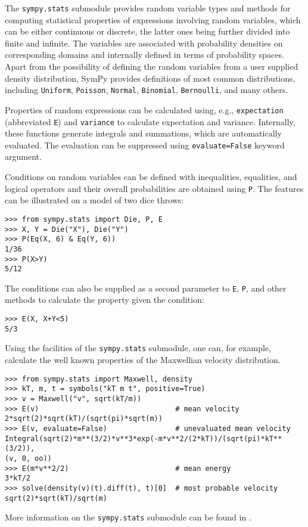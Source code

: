 The \verb|sympy.stats| submodule provides random variable types and methods for
computing statistical properties of expressions involving random
variables, which can be either continuous or discrete, the latter ones being
further divided into finite and infinite. The variables are associated
with probability densities on corresponding domains and internally defined
in terms of probability spaces.
Apart from the possibility of defining the random variables from a user supplied
density distribution, SymPy provides definitions of most common
distributions, including \texttt{Uniform}, \texttt{Poisson}, \texttt{Normal},
\texttt{Binomial}, \texttt{Bernoulli}, and many others.

Properties of random expressions can be calculated using, e.g.,
\texttt{expectation} (abbreviated \texttt{E}) and \texttt{variance} to
calculate expectation and variance. Internally, these functions generate
integrals and summations, which are automatically evaluated. The evaluation
can be suppressed using \texttt{evaluate=False} keyword argument.

Conditions on random variables can be defined with inequalities, equalities,
and logical operators and their overall probabilities are obtained using
\texttt{P}. The features can be illustrated on a model of two dice throws:
\begin{verbatim}
>>> from sympy.stats import Die, P, E
>>> X, Y = Die("X"), Die("Y")
>>> P(Eq(X, 6) & Eq(Y, 6))
1/36
>>> P(X>Y)
5/12
\end{verbatim}
The conditions can also be supplied as a second parameter to \texttt{E},
\texttt{P}, and other methods to calculate the property given the condition:
\begin{verbatim}
>>> E(X, X+Y<5)
5/3
\end{verbatim}

Using the facilities of the \texttt{sympy.stats} submodule, one can, for
example, calculate
the well known properties of the Maxwellian velocity distribution.
\begin{verbatim}
>>> from sympy.stats import Maxwell, density
>>> kT, m, t = symbols("kT m t", positive=True)
>>> v = Maxwell("v", sqrt(kT/m))
>>> E(v)                                # mean velocity
2*sqrt(2)*sqrt(kT)/(sqrt(pi)*sqrt(m))
>>> E(v, evaluate=False)                # unevaluated mean velocity
Integral(sqrt(2)*m**(3/2)*v**3*exp(-m*v**2/(2*kT))/(sqrt(pi)*kT**(3/2)),
(v, 0, oo))
>>> E(m*v**2/2)                         # mean energy
3*kT/2
>>> solve(density(v)(t).diff(t), t)[0]  # most probable velocity
sqrt(2)*sqrt(kT)/sqrt(m)
\end{verbatim}

More information on the \texttt{sympy.stats} submodule can be found in
\cite{StatsMRocklin}.
